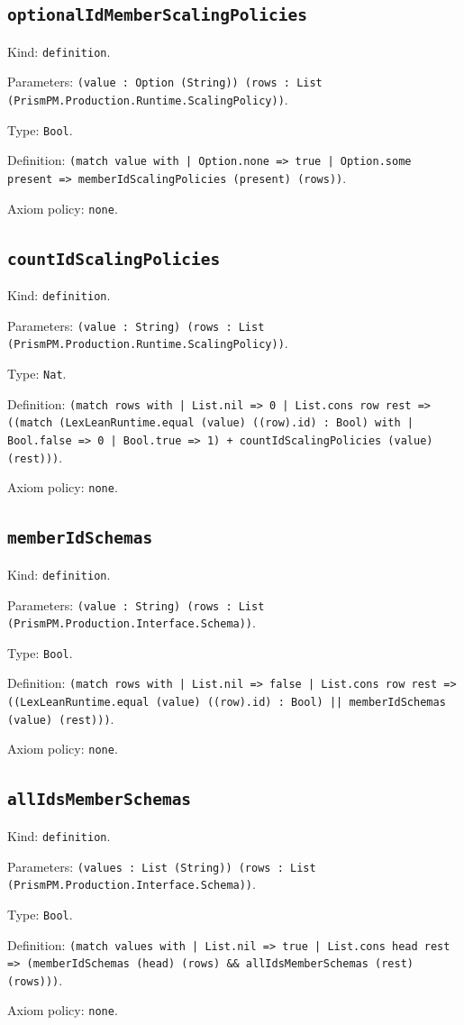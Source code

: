 \documentclass[11pt]{article}
\begin{document}
\subsection*{\texttt{optionalIdMemberScalingPolicies}}
\noindent Kind: \texttt{definition}.\par
\noindent Parameters: \texttt{(value : Option (String)) (rows : List (PrismPM.Production.Runtime.ScalingPolicy))}.\par
\noindent Type: \texttt{Bool}.\par
\noindent Definition: \texttt{(match value with | Option.none => true | Option.some present => memberIdScalingPolicies (present) (rows))}.\par
\noindent Axiom policy: \texttt{none}.\par
\subsection*{\texttt{countIdScalingPolicies}}
\noindent Kind: \texttt{definition}.\par
\noindent Parameters: \texttt{(value : String) (rows : List (PrismPM.Production.Runtime.ScalingPolicy))}.\par
\noindent Type: \texttt{Nat}.\par
\noindent Definition: \texttt{(match rows with | List.nil => 0 | List.cons row rest => ((match (LexLeanRuntime.equal (value) ((row).id) : Bool) with | Bool.false => 0 | Bool.true => 1) + countIdScalingPolicies (value) (rest)))}.\par
\noindent Axiom policy: \texttt{none}.\par
\subsection*{\texttt{memberIdSchemas}}
\noindent Kind: \texttt{definition}.\par
\noindent Parameters: \texttt{(value : String) (rows : List (PrismPM.Production.Interface.Schema))}.\par
\noindent Type: \texttt{Bool}.\par
\noindent Definition: \texttt{(match rows with | List.nil => false | List.cons row rest => ((LexLeanRuntime.equal (value) ((row).id) : Bool) || memberIdSchemas (value) (rest)))}.\par
\noindent Axiom policy: \texttt{none}.\par
\subsection*{\texttt{allIdsMemberSchemas}}
\noindent Kind: \texttt{definition}.\par
\noindent Parameters: \texttt{(values : List (String)) (rows : List (PrismPM.Production.Interface.Schema))}.\par
\noindent Type: \texttt{Bool}.\par
\noindent Definition: \texttt{(match values with | List.nil => true | List.cons head rest => (memberIdSchemas (head) (rows) \&\& allIdsMemberSchemas (rest) (rows)))}.\par
\noindent Axiom policy: \texttt{none}.\par
\end{document}
